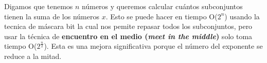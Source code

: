 Digamos que tenemos $n$ números y queremos calcular cuántos subconjuntos tienen la suma de los números $x$.
Esto se puede hacer en tiempo O($2^n$) usando la tecnica de máscara bit la cual nos pemite repasar todos los subconjuntos, pero usar la técnica de \textbf{encuentro en el medio (\emph{meet in the middle})} solo toma tiempo O($2^{\frac{n}{2}}$). Esta es una mejora significativa porque el número del exponente se reduce a la mitad.